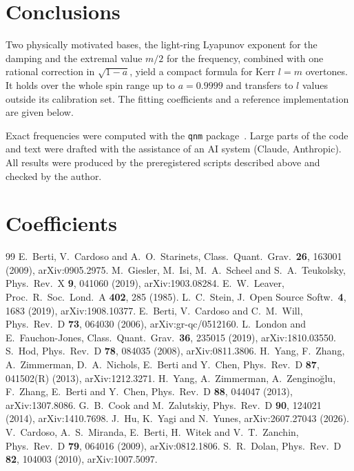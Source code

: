 \documentclass[prd,twocolumn,superscriptaddress,nofootinbib]{revtex4-2}
\begin{document}
\section{Conclusions}

Two physically motivated bases, the light-ring Lyapunov exponent for the damping and the extremal value $m/2$ for the
frequency, combined with one rational correction in $\sqrt{1-a}$, yield a compact formula for Kerr $l=m$ overtones.
It holds over the whole spin range up to $a=0.9999$ and transfers to $l$ values outside its calibration set. The
fitting coefficients and a reference implementation are given below.

\begin{acknowledgments}
Exact frequencies were computed with the \texttt{qnm} package~\cite{Stein:2019mop}. Large parts of the code and text
were drafted with the assistance of an AI system (Claude, Anthropic). All results were produced by the preregistered
scripts described above and checked by the author.
\end{acknowledgments}

\appendix
\section{Coefficients}\label{app:coef}


\begin{thebibliography}{99}
 E.~Berti, V.~Cardoso and A.~O.~Starinets, Class.\ Quant.\ Grav.\ \textbf{26}, 163001 (2009),
arXiv:0905.2975.
 M.~Giesler, M.~Isi, M.~A.~Scheel and S.~A.~Teukolsky, Phys.\ Rev.\ X \textbf{9}, 041060
(2019), arXiv:1903.08284.
 E.~W.~Leaver, Proc.\ R.\ Soc.\ Lond.\ A \textbf{402}, 285 (1985).
 L.~C.~Stein, J.\ Open Source Softw.\ \textbf{4}, 1683 (2019), arXiv:1908.10377.
 E.~Berti, V.~Cardoso and C.~M.~Will, Phys.\ Rev.\ D \textbf{73}, 064030 (2006),
arXiv:gr-qc/0512160.
 L.~London and E.~Fauchon-Jones, Class.\ Quant.\ Grav.\ \textbf{36}, 235015 (2019),
arXiv:1810.03550.
 S.~Hod, Phys.\ Rev.\ D \textbf{78}, 084035 (2008), arXiv:0811.3806.
 H.~Yang, F.~Zhang, A.~Zimmerman, D.~A.~Nichols, E.~Berti and Y.~Chen, Phys.\ Rev.\ D
\textbf{87}, 041502(R) (2013), arXiv:1212.3271.
 H.~Yang, A.~Zimmerman, A.~Zengino\u{g}lu, F.~Zhang, E.~Berti and Y.~Chen, Phys.\ Rev.\ D
\textbf{88}, 044047 (2013), arXiv:1307.8086.
 G.~B.~Cook and M.~Zalutskiy, Phys.\ Rev.\ D \textbf{90}, 124021 (2014), arXiv:1410.7698.
 J.~Hu, K.~Yagi and N.~Yunes, arXiv:2607.27043 (2026).
 V.~Cardoso, A.~S.~Miranda, E.~Berti, H.~Witek and V.~T.~Zanchin, Phys.\ Rev.\ D \textbf{79},
064016 (2009), arXiv:0812.1806.
 S.~R.~Dolan, Phys.\ Rev.\ D \textbf{82}, 104003 (2010), arXiv:1007.5097.
\end{thebibliography}
\end{document}
